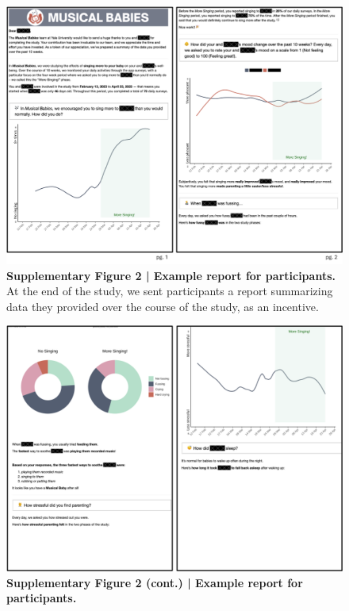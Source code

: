 \documentclass[
]{article}
\begin{document}
\begin{figure}[p]

{\centering \includegraphics[width=0.9\linewidth,]{../viz/s_figure2a} 

}

\caption{\textbf{Supplementary Figure 2 | Example report for participants.} At the end of the study, we sent participants a report summarizing data they provided over the course of the study, as an incentive.}\label{fig:supp fig 2}
\end{figure}
\begin{figure}[p]

{\centering \includegraphics[width=0.9\linewidth,]{../viz/s_figure2b} 

}

\caption{\textbf{Supplementary Figure 2 (cont.) | Example report for participants.}}\label{fig:supp fig 2b}
\end{figure}
\end{document}
